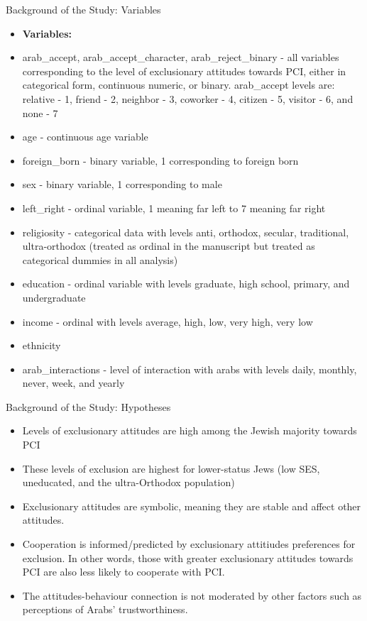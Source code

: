 \documentclass{beamer}
\begin{document}
\begin{frame}{Background of the Study: Variables}
\begin{itemize}
	\item \textbf{Variables:}
	\item arab\_accept, arab\_accept\_character, arab\_reject\_binary - all variables corresponding to the level of exclusionary attitudes towards PCI, either in categorical form, continuous numeric, or binary. arab\_accept levels are: relative - 1, friend - 2, neighbor - 3, coworker - 4, citizen - 5, visitor - 6, and none - 7
	\item age - continuous age variable
	\item foreign\_born - binary variable, 1 corresponding to foreign born 
	\item sex - binary variable, 1 corresponding to male
	\item left\_right - ordinal variable, 1 meaning far left to 7 meaning far right             
	\item religiosity - categorical data with levels anti, orthodox, secular, traditional, ultra-orthodox (treated as ordinal in the manuscript but treated as categorical dummies in all analysis)
	\item education - ordinal variable with levels graduate, high school, primary, and undergraduate
	\item income - ordinal with levels average, high, low, very high, very low 
	\item ethnicity 
	\item arab\_interactions - level of interaction with arabs with levels daily, monthly, never, week, and yearly
\end{itemize}
\end{frame}


\begin{frame}{Background of the Study: Hypotheses}
	\begin{itemize}
		\item Levels of exclusionary attitudes are high among the Jewish majority towards PCI
		\item These levels of exclusion are highest for lower-status Jews (low SES, uneducated, and the ultra-Orthodox population)
		\item Exclusionary attitudes are symbolic, meaning they are stable and affect other attitudes.
		\item Cooperation is informed/predicted by exclusionary attitiudes preferences for exclusion. In other words, those with greater exclusionary attitudes towards PCI are also less likely to cooperate with PCI.
		\item The attitudes-behaviour connection is not moderated by other factors such as perceptions of Arabs’ trustworthiness.
	\end{itemize}
\end{frame}
\end{document}
